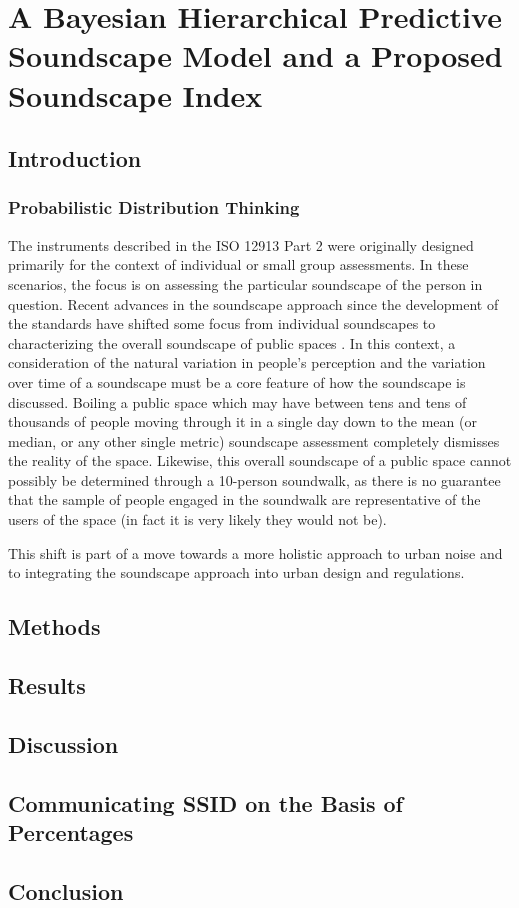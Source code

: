 \chapter{A Bayesian Hierarchical Predictive Soundscape Model and a Proposed Soundscape Index}
\label{ch:bayes}

\section{Introduction}
 \subsection{Probabilistic Distribution Thinking}

   The instruments described in the ISO 12913 Part 2 \citet{ISO12913_2_2018IOS} were originally designed primarily for the context of individual or small group assessments. In these scenarios, the focus is on assessing the particular soundscape of the person in question. Recent advances in the soundscape approach since the development of the standards have shifted some focus from individual soundscapes to characterizing the overall soundscape of public spaces \citep{Mitchell2020Soundscape}. In this context, a consideration of the natural variation in people's perception and the variation over time of a soundscape must be a core feature of how the soundscape is discussed. Boiling a public space which may have between tens and tens of thousands of people moving through it in a single day down to the mean (or median, or any other single metric) soundscape assessment completely dismisses the reality of the space. Likewise, this overall soundscape of a public space cannot possibly be determined through a 10-person soundwalk, as there is no guarantee that the sample of people engaged in the soundwalk are representative of the users of the space (in fact it is very likely they would not be).

   This shift is part of a move towards a more holistic approach to urban noise and to integrating the soundscape approach into urban design and regulations.

\section{Methods}

\section{Results}

\section{Discussion}

\section{Communicating SSID on the Basis of Percentages}

\section{Conclusion}

